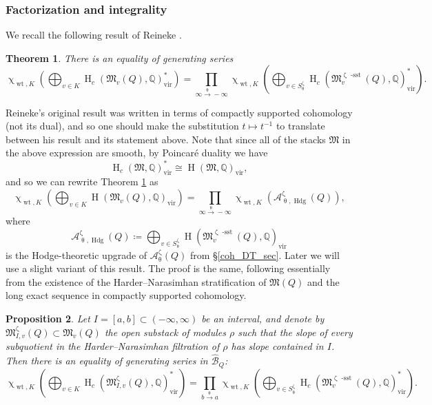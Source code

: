 \documentclass{amsart}
\newcommand{\Mst}{\mathfrak{M}}
\newcommand{\QQ}{\mathbb{Q}}
\DeclareMathOperator{\Wt}{wt}
\DeclareMathOperator{\HO}{H}
\DeclareMathOperator{\sstable}{-sst}
\DeclareMathOperator{\vir}{vir}
\DeclareMathOperator{\Hodge}{Hdg}
\let\bb=\mathbb
\renewcommand{\theta}{\uptheta}
\renewcommand{\zeta}{\upzeta}
\renewcommand{\chi}{\upchi}
\theoremstyle{plain}%
\newtheorem{thm}{Theorem}[section]
\newtheorem{prop}[thm]{Proposition}
\theoremstyle{definition}
\theoremstyle{remark}
\begin{document}
\subsubsection{Factorization and integrality}

We recall the following result of Reineke \cite[Sec. 6]{ReinHN}.
\begin{thm}\label{refWCF}
There is an equality of generating series
\[
\chi_{\Wt,K}\left(\bigoplus_{v\in K}\HO_c(\Mst_v(Q),\mathbb{Q})^*_{\vir}\right)=\prod_{\infty\xrightarrow{\theta} -\infty}\chi_{\Wt,K}\left(\bigoplus_{v\in S^{\zeta}_{\theta}}\HO_c(\Mst^{\zeta\sstable}_{v}(Q),\bb{Q})_{\vir}^*\right).
\]
\end{thm}
Reineke's original result was written in terms of compactly supported cohomology (not its dual), and so one should make the substitution $t\mapsto t^{-1}$ to translate between his result and its statement above.  Note that since all of the stacks $\Mst$ in the above expression are smooth, by Poincar\'e duality we have 
\[
\HO_c(\Mst,\mathbb{Q})^*_{\vir}\cong \HO(\Mst,\mathbb{Q})_{\vir},
\]
and so we can rewrite Theorem \ref{refWCF} as
\[
\chi_{\Wt,K}\left(\bigoplus_{v\in K}\HO(\Mst_v(Q),\mathbb{Q})_{\vir}\right)=\prod_{\infty\xrightarrow{\theta} -\infty}\chi_{\Wt,K}\left(\mathcal{A}^{\zeta}_{\theta,\Hodge}(Q)\right),
\]
where
\[
\mathcal{A}^{\zeta}_{\theta,\Hodge}(Q)\coloneqq \bigoplus_{v\in S^{\zeta}_{\theta}}\HO(\Mst^{\zeta\sstable}_v(Q),\QQ)_{\vir}
\]
is the Hodge-theoretic upgrade of $\mathcal{A}_{\theta}^{\zeta}(Q)$ from \S \ref{coh_DT_sec}.
Later we will use a slight variant of this result.  The proof is the same, following essentially from the existence of the Harder--Narasimhan stratification of $\Mst(Q)$ and the long exact sequence in compactly supported cohomology.  
\begin{prop}\label{I_WCF}
Let $I=[a,b]\subset (-\infty,\infty)$ be an interval, and denote by $\Mst^{\zeta}_{I,v}(Q)\subset \Mst_v(Q)$ the open substack of modules $\rho$ such that the slope of every subquotient in the Harder--Narasimhan filtration of $\rho$ has slope contained in $I$.  Then there is an equality of generating series in $\hat{\mathscr{B}}_Q$:
\begin{equation}
    \label{WCFwt}
\chi_{\Wt,K}\left(\bigoplus_{v\in K}\HO_c(\Mst^{\zeta}_{I,v}(Q),\mathbb{Q})_{\vir}^*\right)=\prod_{b\xrightarrow{\theta} a}\chi_{\Wt,K}\left(\bigoplus_{v\in S^{\zeta}_{\theta}}\HO_c(\Mst^{\zeta\sstable}_{v}(Q),\QQ)_{\vir}^*\right).
\end{equation}
\end{prop}
\end{document}

